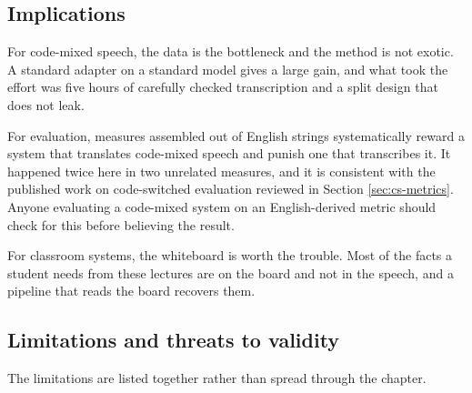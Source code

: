 \subsection{Implications}

For code-mixed speech, the data is the bottleneck and the method is not exotic. A standard
adapter on a standard model gives a large gain, and what took the effort was five hours of
carefully checked transcription and a split design that does not leak.

For evaluation, measures assembled out of English strings systematically reward a system
that translates code-mixed speech and punish one that transcribes it. It happened twice
here in two unrelated measures, and it is consistent with the published work on
code-switched evaluation reviewed in Section \ref{sec:cs-metrics}. Anyone evaluating a code-mixed system
on an English-derived metric should check for this before believing the result.

For classroom systems, the whiteboard is worth the trouble. Most of the facts a student
needs from these lectures are on the board and not in the speech, and a pipeline that
reads the board recovers them.

\subsection{Limitations and threats to validity}

The limitations are listed together rather than spread through the chapter.

